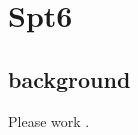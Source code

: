 \chapter{Spt6}

\section{background}

\lipsum

Please work \cite{doris2018}.

\newpage

\begingroup
\singlespacing

\endgroup
